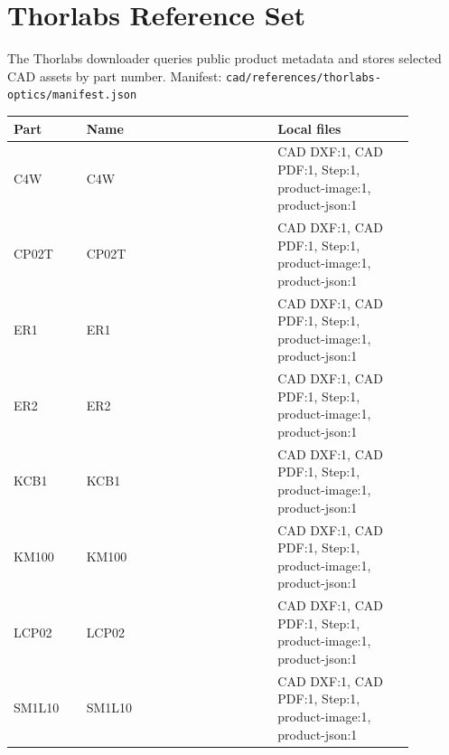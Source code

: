 \documentclass[10pt]{article}
\begin{document}
\section{Thorlabs Reference Set}
The Thorlabs downloader queries public product metadata and stores selected CAD assets by part number.
Manifest: \texttt{cad/references/thorlabs-optics/manifest.json}
\begin{longtable}{p{0.16\linewidth}p{0.42\linewidth}p{0.30\linewidth}}
\textbf{Part} & \textbf{Name} & \textbf{Local files} \\ \hline
C4W & C4W & CAD DXF:1, CAD PDF:1, Step:1, product-image:1, product-json:1 \\
CP02T & CP02T & CAD DXF:1, CAD PDF:1, Step:1, product-image:1, product-json:1 \\
ER1 & ER1 & CAD DXF:1, CAD PDF:1, Step:1, product-image:1, product-json:1 \\
ER2 & ER2 & CAD DXF:1, CAD PDF:1, Step:1, product-image:1, product-json:1 \\
KCB1 & KCB1 & CAD DXF:1, CAD PDF:1, Step:1, product-image:1, product-json:1 \\
KM100 & KM100 & CAD DXF:1, CAD PDF:1, Step:1, product-image:1, product-json:1 \\
LCP02 & LCP02 & CAD DXF:1, CAD PDF:1, Step:1, product-image:1, product-json:1 \\
SM1L10 & SM1L10 & CAD DXF:1, CAD PDF:1, Step:1, product-image:1, product-json:1 \\
\end{longtable}
\end{document}
